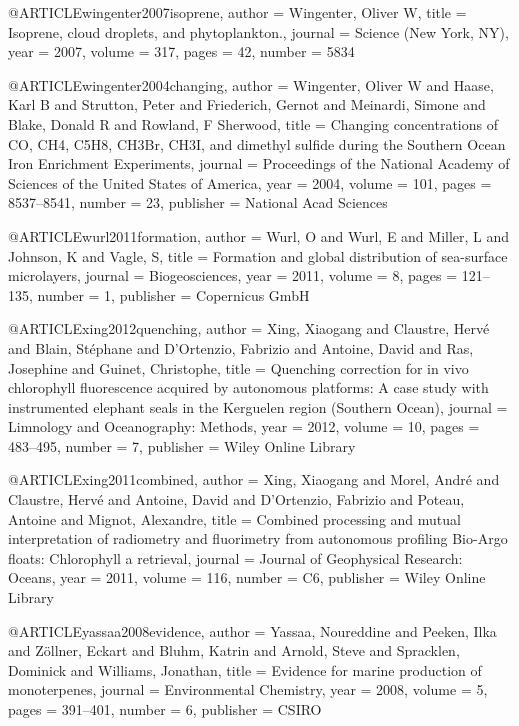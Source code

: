 @ARTICLE{wingenter2007isoprene,
  author = {Wingenter, Oliver W},
  title = {Isoprene, cloud droplets, and phytoplankton.},
  journal = {Science (New York, NY)},
  year = {2007},
  volume = {317},
  pages = {42},
  number = {5834}
}

@ARTICLE{wingenter2004changing,
  author = {Wingenter, Oliver W and Haase, Karl B and Strutton, Peter and Friederich,
	Gernot and Meinardi, Simone and Blake, Donald R and Rowland, F Sherwood},
  title = {Changing concentrations of CO, CH4, C5H8, CH3Br, CH3I, and dimethyl
	sulfide during the Southern Ocean Iron Enrichment Experiments},
  journal = {Proceedings of the National Academy of Sciences of the United States
	of America},
  year = {2004},
  volume = {101},
  pages = {8537--8541},
  number = {23},
  publisher = {National Acad Sciences}
}

@ARTICLE{wurl2011formation,
  author = {Wurl, O and Wurl, E and Miller, L and Johnson, K and Vagle, S},
  title = {Formation and global distribution of sea-surface microlayers},
  journal = {Biogeosciences},
  year = {2011},
  volume = {8},
  pages = {121--135},
  number = {1},
  publisher = {Copernicus GmbH}
}

@ARTICLE{xing2012quenching,
  author = {Xing, Xiaogang and Claustre, Herv{\'e} and Blain, St{\'e}phane and
	D'Ortenzio, Fabrizio and Antoine, David and Ras, Josephine and Guinet,
	Christophe},
  title = {Quenching correction for in vivo chlorophyll fluorescence acquired
	by autonomous platforms: A case study with instrumented elephant
	seals in the Kerguelen region (Southern Ocean)},
  journal = {Limnology and Oceanography: Methods},
  year = {2012},
  volume = {10},
  pages = {483--495},
  number = {7},
  publisher = {Wiley Online Library}
}

@ARTICLE{xing2011combined,
  author = {Xing, Xiaogang and Morel, Andr{\'e} and Claustre, Herv{\'e} and Antoine,
	David and D'Ortenzio, Fabrizio and Poteau, Antoine and Mignot, Alexandre},
  title = {Combined processing and mutual interpretation of radiometry and fluorimetry
	from autonomous profiling Bio-Argo floats: Chlorophyll a retrieval},
  journal = {Journal of Geophysical Research: Oceans},
  year = {2011},
  volume = {116},
  number = {C6},
  publisher = {Wiley Online Library}
}

@ARTICLE{yassaa2008evidence,
  author = {Yassaa, Noureddine and Peeken, Ilka and Z{\"o}llner, Eckart and Bluhm,
	Katrin and Arnold, Steve and Spracklen, Dominick and Williams, Jonathan},
  title = {Evidence for marine production of monoterpenes},
  journal = {Environmental Chemistry},
  year = {2008},
  volume = {5},
  pages = {391--401},
  number = {6},
  publisher = {CSIRO}
}

